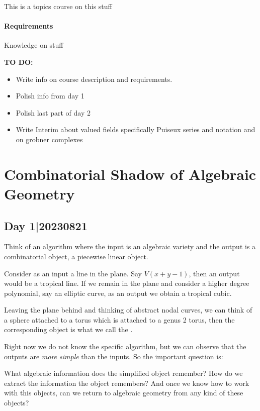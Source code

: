 \documentclass[12pt]{memoir}
\begin{document}
\maketitle
{\small 
\setlength{\parindent}{0em}
\setlength{\parskip}{1em}

This is a topics course on this stuff

\subsubsection*{Requirements}
Knowledge on stuff\par 

\textbf{TO DO:}
\begin{itemize}
    \item Write info on course description and requirements.
    \item Polish info from day 1
    \item Polish last part of day 2
    \item Write Interim about valued fields specifically Puiseux series and notation and on grobner complexes
\end{itemize}
}
\newpage
\tableofcontents
\chapter{Combinatorial Shadow of Algebraic Geometry}

\section{Day 1|20230821}

Think of an algorithm where the input is an algebraic variety and the output is a combinatorial object, a piecewise linear object.

\begin{Ex}
    Consider as an input a line in the plane. Say $V(x+y-1)$, then an output would be a tropical line. If we remain in the plane and consider a higher degree polynomial, say an elliptic curve, as an output we obtain a tropical cubic.\par 
    Leaving the plane behind and thinking of abstract nodal curves, we can think of a sphere attached to a torus which is attached to a genus 2 torus, then the corresponding object is what we call the .
\end{Ex}

Right now we do not know the specific algorithm, but we can observe that the outputs are \emph{more simple} than the inputs. So the important question is:
\begin{significant}
What algebraic information does the simplified object remember? How do we extract the information the object remembers? And once we know how to work with this objects, can we return to algebraic geometry from any kind of these objects?
\end{significant}
\end{document}
